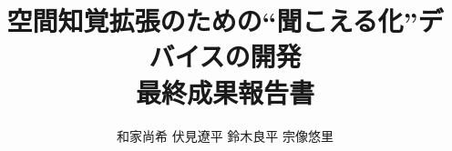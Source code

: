 \documentclass[11pt]{jsarticle}
\begin{document}
\newcommand{\heading}[1]{
    \vspace{0.1in}
    {\noindent {\underline {\textsf {\textbf #1}}}}
    \hspace{0.05in}
}

 \makeatletter
    \renewcommand{\thefigure}{
    \thesection.\arabic{figure}}
  \makeatother

  \makeatletter
    \renewcommand{\thetable}{%
    \thesection.\arabic{table}}
  \makeatother

\title{空間知覚拡張のための``聞こえる化''デバイスの開発\\最終成果報告書}
\author{和家尚希 伏見遼平 鈴木良平 宗像悠里}
\maketitle

\tableofcontents %
\thispagestyle{empty} %












\end{document}

